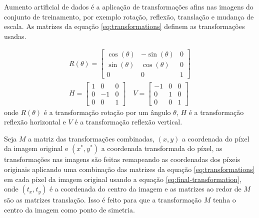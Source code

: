 Aumento artificial de dados \cite{Larry1996} é a aplicação de transformações afins nas imagens do conjunto de treinamento, por exemplo rotação, reflexão, translação e mudança de escala. As matrizes da equação \eqref{eq:transformations} definem as transformações usadas.

\begin{equation} \label{eq:transformations}
  \begin{gathered}
    R(\theta) =
    \begin{bmatrix}
      \cos(\theta) & -\sin(\theta) & 0 \\
      \sin(\theta) & \cos(\theta)  & 0 \\
      0            & 0             & 1
    \end{bmatrix}
    \\[1.5ex]
    H =
    \begin{bmatrix}
      1 & 0  & 0 \\
      0 & -1 & 0 \\
      0 & 0  & 1
    \end{bmatrix}
    \quad
    V =
    \begin{bmatrix}
      -1 & 0 & 0 \\
      0  & 1 & 0 \\
      0  & 0 & 1
    \end{bmatrix}
  \end{gathered}
\end{equation}
%
onde $R(\theta)$ é a transformação rotação por um ângulo $\theta$,
$H$ é a transformação reflexão horizontal e $V$ é a transformação reflexão vertical.

Seja $M$ a matriz das transformações combinadas, $(x, y)$ a coordenada do píxel da imagem original e $(x^*, y^*)$ a coordenada transformada do píxel, as transformações nas imagens são feitas remapeando as coordenadas dos píxeis originais aplicando uma combinação das matrizes da equação \eqref{eq:transformations} em cada píxel da imagem original usando a equação \eqref{eq:final-transformation}, onde $(t_x, t_y)$ é a coordenada do centro da imagem e as matrizes ao redor de $M$ são as matrizes translação. Isso é feito para que a transformação $M$ tenha o centro da imagem como ponto de simetria.

